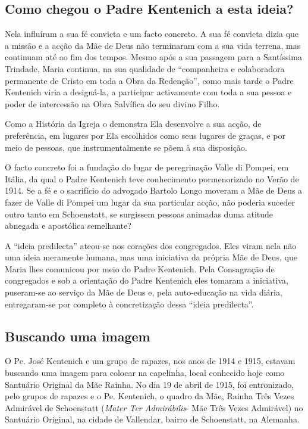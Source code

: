 \documentclass[a4paper,14pt]{extarticle} \usepackage[utf8]{inputenc}
\begin{document}
\subsection{Como chegou o Padre Kentenich a esta ideia?}

Nela influíram a sua fé convicta e um facto concreto. A sua fé convicta dizia que a missão e a acção da Mãe de Deus não terminaram com a sua vida terrena, mas continuam até ao fim dos tempos. Mesmo após a sua passagem para a Santíssima Trindade, Maria continua, na sua qualidade de “companheira e colaboradora permanente de Cristo em toda a Obra da Redenção”, como mais tarde o Padre Kentenich viria a designá-la, a participar activamente com toda a sua pessoa e poder de intercessão na Obra Salvífica do seu divino Filho.

Como a História da Igreja o demonstra Ela desenvolve a sua acção, de preferência, em lugares por Ela escolhidos como seus lugares de graças, e por meio de pessoas, que instrumentalmente se põem à sua disposição.

O facto concreto foi a fundação do lugar de peregrinação Valle di Pompei, em Itália, da qual o Padre Kentenich teve conhecimento pormenorizado no Verão de 1914. Se a fé e o sacrifício do advogado Bartolo Longo moveram a Mãe de Deus a fazer de Valle di Pompei um lugar da sua particular acção, não poderia suceder outro tanto em Schoenstatt, se surgissem pessoas animadas duma atitude abnegada e apostólica semelhante?

A “ideia predilecta” ateou-se nos corações dos congregados. Eles viram nela não uma ideia meramente humana, mas uma iniciativa da própria Mãe de Deus, que Maria lhes comunicou por meio do Padre Kentenich. Pela Consagração de congregados e sob a orientação do Padre Kentenich eles tomaram a iniciativa, puseram-se ao serviço da Mãe de Deus e, pela auto-educação na vida diária, entregaram-se por completo à concretização dessa “ideia predilecta”.

\subsection{Buscando uma imagem}

O Pe. José Kentenich e um grupo de rapazes, nos anos de 1914 e 1915, estavam buscando uma imagem para colocar na capelinha, local conhecido hoje como Santuário Original da Mãe Rainha.
No dia 19 de abril de 1915, foi entronizado, pelo grupos de rapazes e o Pe. Kentenich, o quadro da Mãe, Rainha Três Vezes Admirável de Schoenstatt (\textit{Mater Ter Admirábilis}- Mãe Três Vezes Admirável) no Santuário Original, na cidade de Vallendar, bairro de Schoenstatt, na Alemanha.
\end{document}
